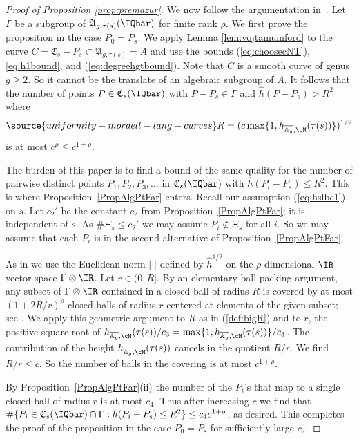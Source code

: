\begin{proof}[Proof of Proposition \ref{prop:premazur}]
  We now follow the argumentation in~\cite{DGH1p}. Let $\Gamma$ be a
  subgroup of $\mathfrak{A}_{g,\tau(s)}(\IQbar)$ for finite rank $\rho$.
  We first prove the proposition in the case $P_0=P_s$. We apply Lemma
  \ref{lem:vojtamumford}  to the curve $C =
  \mathfrak{C}_s-P_s\subset \mathfrak{A}_{g,\tau(s)}=A$ and use the bounds
  (\ref{eq:choosecNT}), \eqref{eq:h1bound}, and
  (\ref{eq:degreehgtbound}).
  Note that $C$ is a smooth curve of genus
  $g\ge 2$. So it cannot be the translate of an algebraic subgroup of
  $A$.
  It follows that the number of points $P\in
  \mathfrak{C}_s(\IQbar)$ with $P-P_s\in \Gamma$ and $\hat h(P-P_s) >
  R^2$ where
  \begin{equation}
    \label{def:bigR}
\source{uniformity-mordell-lang-curves}
    R= (c\max\{1,h_{\overline{\mathbb{A}_g},\cM}(\tau(s))\})^{1/2}
  \end{equation}
  is at most  $c^{\rho}\le c^{1+\rho}$.

  The burden of this paper is  to find a bound of the same quality
  for the number of pairwise distinct points $P_1,P_2,P_3,\ldots$  in
  $\mathfrak{C}_s(\IQbar)$ with $\hat h(P_i-P_s) \le R^2$. This is where
  Proposition~\ref{PropAlgPtFar} enters. Recall our assumption
  (\ref{eq:hslbc1}) on $s$.
  Let $c_2'$ be the constant $c_2$ from Proposition~\ref{PropAlgPtFar}; it is independent of $s$. As
  $\# \Xi_s\le c_2'$ we may assume $P_i\not\in \Xi_s$ for all $i$.
  So we may assume that each $P_i$ is in the second alternative of
  Proposition~\ref{PropAlgPtFar}.

  As in \cite{DGH1p} we use the Euclidean norm $|\cdot|$ defined by $\hat h^{1/2}$ on
  the $\rho$-dimensional  $\IR$-vector space $\Gamma\otimes\IR$.
  Let $r\in (0,R]$. By an elementary ball packing argument, any subset of
  $\Gamma\otimes\IR$ contained in a closed ball of radius $R$ is
  covered by at most $(1+2R/r)^{\rho}$ closed balls of radius $r$ centered at
  elements of the given subset; see \cite[Lemme~6.1]{Remond:Decompte}.
  We apply this geometric argument to $R$ as in (\ref{def:bigR}) and
  to  $r$, the positive square-root of
  $h_{\overline{\mathbb{A}_g},\cM}(\tau(s))/c_3 =
  \max\{1,h_{\overline{\mathbb{A}_g},\cM}(\tau(s))\}/c_3$.
  The contribution of the height
  $h_{\overline{\mathbb{A}_g},\cM}(\tau(s))$ cancels in the quotient
  $R/r$. We find $R/r\le c$. So the
  number of balls in the covering is at most $c^{1+\rho}$.

  By Proposition~\ref{PropAlgPtFar}(ii) the number of the $P_i$'s that
  map to a single closed ball of radius $r$ is
  at most $c_4$. Thus after increasing $c$ we find that $\#\{P_i \in \mathfrak{C}_s(\IQbar)\cap \Gamma : \hat{h}(P_i-P_s) \le R^2\} \le c_4 c^{1+\rho}$, %
as desired.
  This completes the proof of the proposition in the case $P_0=P_s$
  for sufficiently large $c_2$.


\end{proof}
